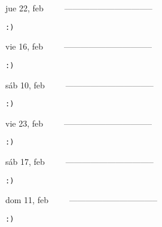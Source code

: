 \documentclass[letterpaper,10pt]{article}
\begin{document}
\begin{multicols}{3}
{jue 22, feb\ \ \ \ \ --------------------------------}
\begin{flushright}\begin{small}\texttt{:)}\end{small}\end{flushright}
\vfill
{vie 16, feb\ \ \ \ \ --------------------------------}
\begin{flushright}\begin{small}\texttt{:)}\end{small}\end{flushright}\par
\vfill
{sáb 10, feb\ \ \ \ \ --------------------------------}
\begin{flushright}\begin{small}\texttt{:)}\end{small}\end{flushright}\par
\vfill
\end{multicols}
\vspace{1.05cm}

\begin{multicols}{3}
{vie 23, feb\ \ \ \ \ --------------------------------}
\begin{flushright}\begin{small}\texttt{:)}\end{small}\end{flushright}
\vfill
{sáb 17, feb\ \ \ \ \ --------------------------------}
\begin{flushright}\begin{small}\texttt{:)}\end{small}\end{flushright}\par
\vfill
{dom 11, feb\ \ \ \ \ --------------------------------}
\begin{flushright}\begin{small}\texttt{:)}\end{small}\end{flushright}\par
\vfill
\end{multicols}
\vspace{1.05cm}
\end{document}
